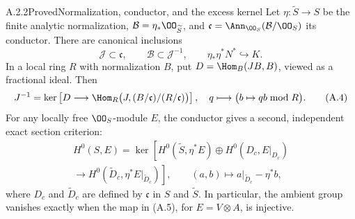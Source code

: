 \begin{statement}{A.2.2}{Proved}{Normalization, conductor, and the excess kernel}
Let $\eta:\widetilde S\to S$ be the finite analytic normalization, $\mathcal B=\eta_*\OO_{\widetilde S}$, and $\mathfrak c=\Ann_{\OO_S}(\mathcal B/\OO_S)$ its conductor. There are canonical inclusions
\[
 \mathcal J\subset\mathfrak c,\qquad
 \mathcal B\subset\mathcal J^{-1},\qquad
 \eta_*\eta^*N^*\hookrightarrow K.
\tag{A.3}
\]
In a local ring $R$ with normalization $B$, put $D=\Hom_B(JB,B)$, viewed as a fractional ideal. Then
\[
 J^{-1}=\ker\left[D\longrightarrow
 \Hom_R\bigl(J,(B/\mathfrak c)/(R/\mathfrak c)\bigr)\right],
\quad q\longmapsto\bigl(b\mapsto qb\bmod R\bigr).
\tag{A.4}
\]
For any locally free $\OO_S$-module $E$, the conductor gives a second, independent exact section criterion:
\begin{multline}
H^0(S,E)=
\ker\left[H^0(\widetilde S,\eta^*E)\oplus H^0(D_c,E|_{D_c})\right.\\
\left.\longrightarrow H^0(\widetilde D_c,\eta^*E|_{\widetilde D_c})\right],
\qquad (a,b)\longmapsto a|_{\widetilde D_c}-\eta^*b,
\tag{A.5}
\end{multline}
where $D_c$ and $\widetilde D_c$ are defined by $\mathfrak c$ in $S$ and $\widetilde S$. In particular, the ambient group vanishes exactly when the map in (A.5), for $E=V\otimes A$, is injective.
\end{statement}

